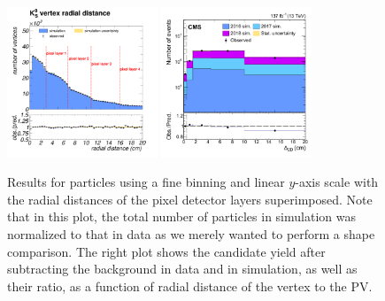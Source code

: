 \begin{figure}[h!]
    \centering
    \includegraphics[width=0.40\textwidth]{Figures/c6/efficiencies/2017E_detector}
    \includegraphics[width=0.40\textwidth]{Figures/paper/K_short_Displacement.pdf}
    \caption{Results for \PKzS particles using a fine binning and
      linear $y$-axis scale with the radial distances of the pixel
      detector layers superimposed. Note that in this plot, the total
      number of \PKzS particles in simulation was normalized to that
      in data as we merely wanted to perform a shape comparison.
      The right plot shows the \PKzS candidate yield after subtracting
      the background in data and in simulation, as well as their
      ratio, as a function of radial distance of the \PKzS vertex to
      the PV. \luka}
    \label{fig:2017_detector}
\end{figure}
